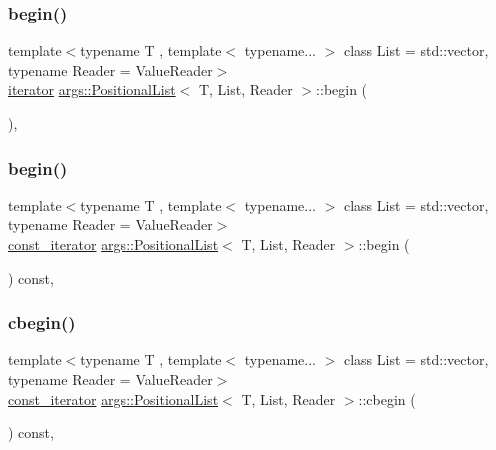 \subsubsection{\texorpdfstring{begin()}{begin()}\hspace{0.1cm}{\footnotesize\ttfamily [1/2]}}
{\footnotesize\ttfamily template$<$typename T , template$<$ typename... $>$ class List = std\+::vector, typename Reader  = Value\+Reader$>$ \\
\hyperlink{classargs_1_1_positional_list_ad0833c77245d7bc7678de4896d8443da}{iterator} \hyperlink{classargs_1_1_positional_list}{args\+::\+Positional\+List}$<$ T, List, Reader $>$\+::begin (\begin{DoxyParamCaption}{ }\end{DoxyParamCaption})\hspace{0.3cm}{\ttfamily [inline]}, {\ttfamily [noexcept]}}

\mbox{\label{classargs_1_1_positional_list_a1b743c31dfc824d884ca55569802363f}} 
\subsubsection{\texorpdfstring{begin()}{begin()}\hspace{0.1cm}{\footnotesize\ttfamily [2/2]}}
{\footnotesize\ttfamily template$<$typename T , template$<$ typename... $>$ class List = std\+::vector, typename Reader  = Value\+Reader$>$ \\
\hyperlink{classargs_1_1_positional_list_a5675a3e27a2a7fc6a7fbd933bd13f3cf}{const\+\_\+iterator} \hyperlink{classargs_1_1_positional_list}{args\+::\+Positional\+List}$<$ T, List, Reader $>$\+::begin (\begin{DoxyParamCaption}{ }\end{DoxyParamCaption}) const\hspace{0.3cm}{\ttfamily [inline]}, {\ttfamily [noexcept]}}

\mbox{\label{classargs_1_1_positional_list_aef5c581f945118e610533e16e139ceeb}} 
\subsubsection{\texorpdfstring{cbegin()}{cbegin()}}
{\footnotesize\ttfamily template$<$typename T , template$<$ typename... $>$ class List = std\+::vector, typename Reader  = Value\+Reader$>$ \\
\hyperlink{classargs_1_1_positional_list_a5675a3e27a2a7fc6a7fbd933bd13f3cf}{const\+\_\+iterator} \hyperlink{classargs_1_1_positional_list}{args\+::\+Positional\+List}$<$ T, List, Reader $>$\+::cbegin (\begin{DoxyParamCaption}{ }\end{DoxyParamCaption}) const\hspace{0.3cm}{\ttfamily [inline]}, {\ttfamily [noexcept]}}

